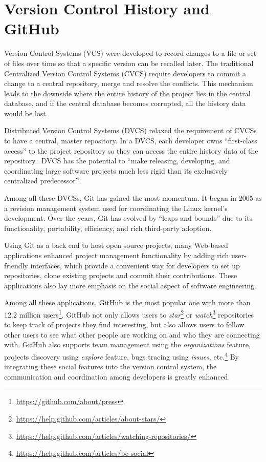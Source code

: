 
\label{chapter:relatedworks}

\newlength{\savedunitlength}
\setlength{\unitlength}{2em}

\section{Version Control History and GitHub}

Version Control Systems (VCS) were developed to record changes to a file or set of files over time so that a specific version can be recalled later. \cite{chacon2009pro} The traditional Centralized Version Control Systems (CVCS) require developers to commit a change to a central repository, merge and resolve the conflicts. This mechanism leads to the downside where the entire history of the project lies in the central database, and if the central database becomes corrupted, all the history data would be lost. \cite{chacon2009pro}\cite{5071408} 

Distributed Version Control Systems (DVCS) relaxed the requirement of CVCSs to have a central, master repository. In a DVCS, each developer owns ``first-class access'' to the project repository so they can access the entire history data of the repository.\cite{5071408}. DVCS has the potential to ``make releasing, developing, and coordinating large software projects much less rigid than its exclusively centralized predecessor''.\cite{6607694}

Among all these DVCSs, Git has gained the most momentum. It began in 2005 as a revision management system used for coordinating the Linux kernel's development. Over the years, Git has evolved by ``leaps and bounds'' due to its functionality, portability, efficiency, and rich third-party adoption.\cite{6188603}

Using Git as a back end to host open source projects, many Web-based applications enhanced project management functionality by adding rich user-friendly interfaces, which provide a convenient way for developers to set up repositories, clone existing projects and commit their contributions.\cite{6188603} These applications also lay more emphasis on the social aspect of software engineering. 

Among all these applications, GitHub is the most popular one with more than 12.2 million users\footnote{\url{https://github.com/about/press}}. GitHub not only allows users to \textit{star}\footnote{\url{https://help.github.com/articles/about-stars/}} or \textit{watch}\footnote{\url{https://help.github.com/articles/watching-repositories/}} repositories to keep track of projects they find interesting, but also allows users to follow other users to see what other people are working on and who they are connecting with. GitHub also supports team management using the \textit{organizations} feature, projects discovery using \textit{explore} feature, bugs tracing using \textit{issues}, etc.\footnote{\url{https://help.github.com/articles/be-social}} By integrating these social features into the version control system, the communication and coordination among developers is greatly enhanced.\cite{6357175}

